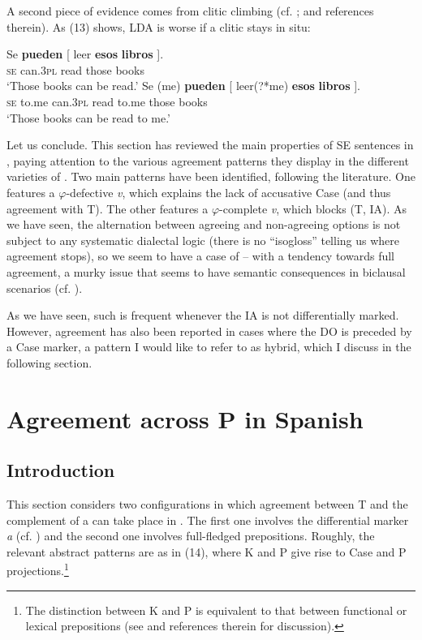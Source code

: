 \documentclass[output=paper]{langsci/langscibook}
\begin{document}
A second piece of evidence comes from clitic climbing (cf. \citealt{Gallego2016,Paradís2016}; and references therein). As (13) shows, LDA is worse if a clitic stays in situ:

\ea%
    \label{ex:gallego:13}
    \ea
    \gll Se  \textbf{pueden}  [ leer   \textbf{esos}    \textbf{libros} ].\\
         \textsc{se} can\textsc{{}.3pl} {}  read  those  books\\
    \glt ‘Those books can be read.’
    \ex
    \gll Se   (me)      \textbf{pueden}  [ leer(?*me)    \textbf{esos}    \textbf{libros} ].\\
         \textsc{se} to.me  can\textsc{{}.3pl} {}   {read   to.me}  those  books\\
    \glt ‘Those books can be read to me.’
    \z
\z

Let us conclude. This section has reviewed the main properties of SE sentences in , paying attention to the various agreement patterns they display in the different varieties of . Two main patterns have been identified, following the literature. One features a $\varphi $-defective \textit{v}, which explains the lack of accusative Case (and thus agreement with T). The other features a $\varphi $-complete \textit{v}, which blocks  (T, IA). As we have seen, the alternation between agreeing and non-agreeing options is not subject to any systematic dialectal logic (there is no “isogloss” telling us where agreement stops), so we seem to have a case of  – with a tendency towards full agreement, a murky issue that seems to have semantic consequences in biclausal scenarios (cf. \citealt{Martin1998,Fernández-Serrano2016}). 

As we have seen, such  is frequent whenever the IA is not differentially marked. However, agreement has also been reported in cases where the DO is preceded by a Case marker, a pattern I would like to refer to as hybrid, which I discuss in the following section.

\section{Agreement across P in Spanish} %
\subsection{Introduction}%

This section considers two configurations in which agreement between T and the complement of a  can take place in . The first one involves the differential marker \textit{a} (cf. \citealt{Torrego1998,López2012}) and the second one involves full-fledged prepositions. Roughly, the relevant abstract patterns are as in (14), where K and P give rise to Case and P projections.\footnote{The distinction between K and P is equivalent to that between functional or lexical prepositions (see \citealt{Riemsdijk1990} and references therein for discussion).}
\end{document}

